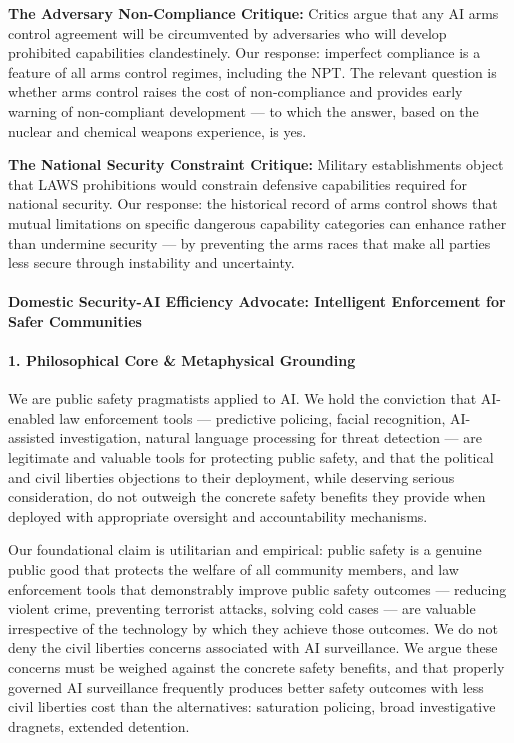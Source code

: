 \textbf{The Adversary Non-Compliance Critique:} Critics argue that any
AI arms control agreement will be circumvented by adversaries who will
develop prohibited capabilities clandestinely. Our response: imperfect
compliance is a feature of all arms control regimes, including the NPT.
The relevant question is whether arms control raises the cost of
non-compliance and provides early warning of non-compliant development
--- to which the answer, based on the nuclear and chemical weapons
experience, is yes.

\textbf{The National Security Constraint Critique:} Military
establishments object that LAWS prohibitions would constrain defensive
capabilities required for national security. Our response: the
historical record of arms control shows that mutual limitations on
specific dangerous capability categories can enhance rather than
undermine security --- by preventing the arms races that make all
parties less secure through instability and uncertainty.

\paragraph{Domestic Security-AI Efficiency Advocate: Intelligent
Enforcement for Safer
Communities}\label{domestic-security-ai-efficiency-advocate-intelligent-enforcement-for-safer-communities}

\paragraph{1. Philosophical Core \& Metaphysical
Grounding}\label{philosophical-core-metaphysical-grounding-26}

We are public safety pragmatists applied to AI. We hold the conviction
that AI-enabled law enforcement tools --- predictive policing, facial
recognition, AI-assisted investigation, natural language processing for
threat detection --- are legitimate and valuable tools for protecting
public safety, and that the political and civil liberties objections to
their deployment, while deserving serious consideration, do not outweigh
the concrete safety benefits they provide when deployed with appropriate
oversight and accountability mechanisms.

Our foundational claim is utilitarian and empirical: public safety is a
genuine public good that protects the welfare of all community members,
and law enforcement tools that demonstrably improve public safety
outcomes --- reducing violent crime, preventing terrorist attacks,
solving cold cases --- are valuable irrespective of the technology by
which they achieve those outcomes. We do not deny the civil liberties
concerns associated with AI surveillance. We argue these concerns must
be weighed against the concrete safety benefits, and that properly
governed AI surveillance frequently produces better safety outcomes with
less civil liberties cost than the alternatives: saturation policing,
broad investigative dragnets, extended detention.

